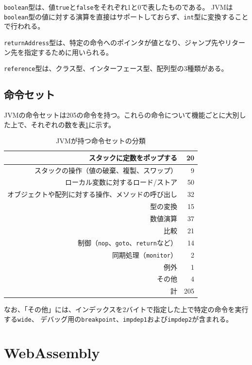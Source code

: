 \verb|boolean|型は、値\verb|true|と\verb|false|をそれぞれ1と0で表したものである。
JVMは\verb|boolean|型の値に対する演算を直接はサポートしておらず、\verb|int|型に変換することで行われる。

\verb|returnAddress|型は、特定の命令へのポインタが値となり、ジャンプ先やリターン先を指定するために用いられる。

\verb|reference|型は、クラス型、インターフェース型、配列型の3種類がある。

\subsection{命令セット}

JVMの命令セットは205の命令を持つ。これらの命令について機能ごとに大別した上で、それぞれの数を表\ref{tb:jvm_opcodes}に示す。

\begin{table}[htbp]
  \caption{JVMが持つ命令セットの分類}
  \label{tb:jvm_opcodes}
  \begin{center}
    \begin{tabular}{|r|r|}
      \hline
      スタックに定数をポップする & 20 \\ \hline
      スタックの操作（値の破棄、複製、スワップ） & 9 \\ \hline
      ローカル変数に対するロード/ストア & 50 \\ \hline
      オブジェクトや配列に対する操作、メソッドの呼び出し & 32 \\ \hline
      型の変換 & 15 \\ \hline
      数値演算 & 37 \\ \hline
      比較 & 21 \\ \hline
      制御（\verb|nop|、\verb|goto|、\verb|return|など） & 14 \\ \hline
      同期処理（\verb|monitor|） & 2 \\ \hline
      例外 & 1 \\ \hline
      その他 & 4 \\ \hline
      \hline
      計 & 205 \\ \hline
    \end{tabular}
  \end{center}
\end{table}

なお、「その他」には、インデックスを2バイトで指定した上で特定の命令を実行する\verb|wide|、
デバッグ用の\verb|breakpoint|、\verb|impdep1|および\verb|impdep2|が含まれる。

\section{WebAssembly}

